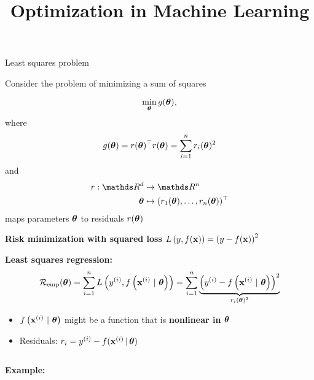 \documentclass[11pt,compress,t,notes=noshow, xcolor=table]{beamer}
\title{Optimization in Machine Learning}
\begin{document}

\begin{vbframe}{Least squares problem}

Consider the problem of minimizing a sum of squares

\begin{equation*}
	\min_{\bm{\theta}} g(\bm{\theta}),
\end{equation*}
where
\begin{equation*}
    g(\bm{\theta}) = r(\bm{\theta})^\top r(\bm{\theta}) = \sum_{i = 1}^n r_i(\bm{\theta})^2
\end{equation*}
and
\begin{align*}
	r: \R^d &\to \R^n \\
	\thetav &\mapsto (r_1(\thetav), \ldots, r_n(\thetav))^\top
\end{align*}
maps parameters $\bm{\theta}$ to residuals $r(\bm{\theta})$

\framebreak 

\textbf{Risk minimization with squared loss} $L\left(y, f(\mathbf{x})\right) = \left(y - f(\mathbf{x})\right)^2$

\medskip

\textbf{Least squares regression:}
\begin{equation*}
    \mathcal{R}_{\text{emp}}(\bm{\theta}) = \sum\limits_{i=1}^n L\left(y^{(i)}, f\left(\mathbf{x}^{(i)} ~|~ \bm{\theta}\right)\right) = \sum\limits_{i=1}^n \underbrace{\left(y^{(i)} - f\left(\mathbf{x}^{(i)} ~|~ \bm{\theta}\right) \right)^2}_{r_i(\bm{\theta})^2}
\end{equation*}

\begin{itemize}
    \item $f\left(\mathbf{x}^{(i)} ~|~ \bm{\theta}\right)$ might be a function that is \textbf{nonlinear in $\bm{\theta}$}
    \item Residuals: $r_i = y^{(i)} - f(\mathbf{x}^{(i)} \,|\, \bm{\theta})$
\end{itemize}

\vspace*{0.3cm} 

\begin{columns}
\begin{column}{0.55\textwidth}
\textbf{Example:} 


\end{column}
\end{columns}
\end{vbframe}
\end{document}
